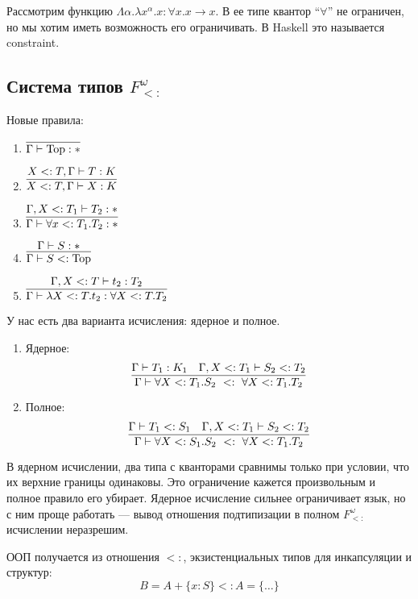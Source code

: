 Рассмотрим функцию \(\Lambda \alpha.\lambda x^\alpha.x : \forall x.x \to x\). В ее типе квантор ``\(\forall\)'' не ограничен, но мы хотим иметь возможность его ограничивать. В Haskell это называется constraint.

\subsection{Система типов \(F_{<:}^\omega\)}

Новые правила:
\begin{enumerate}
    \item \(\infer{\Gamma \vdash \mathrm{Top} : *}{}\)
    \item \(\infer{X <: T, \Gamma \vdash X : K}{X <: T, \Gamma \vdash T : K}\)
    \item \(\infer{\Gamma \vdash \forall x <: T_1 . T_2 : *}{\Gamma, X <: T_1 \vdash T_2 : *}\)
    \item \(\infer{\Gamma \vdash S <: \mathrm{Top}}{\Gamma \vdash S : *}\)
    \item \(\infer{\Gamma \vdash \lambda X <: T.t_2 : \forall X <: T.T_2}{\Gamma, X <: T \vdash t_2 : T_2}\)
\end{enumerate}

У нас есть два варианта исчисления: ядерное и полное.

\begin{enumerate}
    \item Ядерное:
          \[\infer{\Gamma \vdash \forall X <: T_1.S_2\ <:\ \forall X <: T_1.T_2}{\Gamma \vdash T_1 : K_1 & \Gamma, X <: T_1 \vdash S_2 <: T_2}\]
    \item Полное:
          \[\infer{\Gamma \vdash \forall X <: S_1.S_2\ <:\ \forall X <: T_1.T_2}{\Gamma \vdash T_1 <: S_1 & \Gamma, X <: T_1 \vdash S_2 <: T_2}\]
\end{enumerate}

В ядерном исчислении, два типа с кванторами сравнимы только при условии, что их верхние границы одинаковы. Это ограничение кажется произвольным и полное правило его убирает. Ядерное исчисление сильнее ограничивает язык, но с ним проще работать --- вывод отношения подтипизации в полном \(F_{<:}^\omega\) исчислении неразрешим.

ООП получается из отношения \(<:\), экзистенциальных типов для инкапсуляции и структур:
\[B = A + \{x : S\} <: A = \{\ldots\}\]